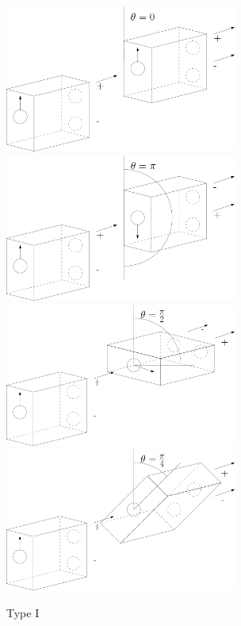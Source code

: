 \documentclass[main.tex]{subfiles}
\begin{document}
\begin{enumerate}
    \begin{figure}
        \centering
        \includegraphics[width=3in]{modules/figs/m01/e09_Type_I_Zero.png}
        \includegraphics[width=3in]{modules/figs/m01/e09_Type_I_Pi.png}
        \includegraphics[width=3in]{modules/figs/m01/e09_Type_I_Pi_Over_2.png}
        \includegraphics[width=3in]{modules/figs/m01/e09_Type_I_Pi_Over_4.png}
        \caption{Type I}
        \label{fig:e09_Type_I}
    \end{figure}
    

\end{enumerate}
\end{document}
